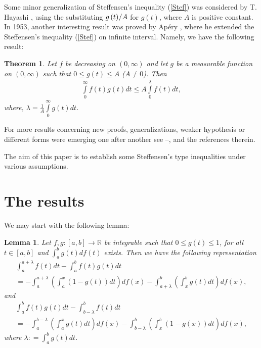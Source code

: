 \documentclass{amsart}
\newtheorem{theorem}{Theorem}
\theoremstyle{plain}
\newtheorem{lemma}{Lemma}
\numberwithin{equation}{section}
\begin{document}
Some minor generalization of Steffensen's inequality (\ref{Stef})
was considered by T. Hayashi \cite{RefD}, using the substituting $
{{g\left( t \right)} \mathord{\left/
 {\vphantom {{g\left( t \right)} A}} \right.
 \kern-\nulldelimiterspace} A}$ for $g\left( t \right)$, where $A$ is positive constant.
In 1953, another interesting result was proved by Ap\'{e}ry
\cite{RefA}, where he extended the Steffensen's inequality
(\ref{Stef}) on infinite interval. Namely, we have the following
result:
\begin{theorem}
Let $f$ be decreasing on $(0, \infty)$ and let $g$ be a measurable
function on $(0, \infty)$ such that $0 \le g(t) \le A$ ($A\neq
0$). Then
\begin{eqnarray}
\label{Apery} \int\limits_{0}^{\infty} {f\left( t \right)g\left( t
\right)dt} \le A \int\limits_0^{\lambda } {f\left( t \right)dt},
\end{eqnarray}
where, $\lambda  = \frac{1}{A}\int\limits_0^{\infty} {g\left( t
\right)dt}$.
\end{theorem}
For more results concerning new proofs, generalizations, weaker
hypothesis or different forms were emerging one after another see
\cite{RefA}--\cite{RefN}, and the references therein.
\newline



The aim of this paper is to establish some Steffensen's type
inequalities under various assumptions.


\section{The results }

We may start with the following lemma:
\begin{lemma}\cite{RefK}
\label{lemma1}Let $f,g: [a,b] \to \mathbb{R}$ be integrable such
that $0 \le g(t) \le 1$, for all $t \in [a,b]$ and $\int_a^b
{g\left( t \right)df\left( t \right)}$  exists. Then we have the
following representation
\begin{multline}
\label{eq2.1}\int_a^{a + \lambda } {f\left( t \right)dt}  -
\int_a^b {f\left( t \right)g\left( t \right)dt}
\\
= -  \int_a^{a + \lambda } {\left( {\int_a^x {\left( {1 - g\left(
t \right)} \right)dt} } \right)df\left( x \right)} - \int_{a +
\lambda }^b {\left( {\int_x^b {g\left( t \right)dt} }
\right)df\left( x \right)} ,
\end{multline}
and
\begin{multline}
\label{eq2.2} \int_a^b {f\left( t \right)g\left( t \right)dt -
\int_{b - \lambda }^b {f\left( t \right)dt} }
\\
=  - \int_a^{b - \lambda } {\left( {\int_a^x {g(t)dt} }
\right)df\left( x \right)}  - \int_{b - \lambda }^b {\left(
{\int_x^b {\left( {1 - g\left( x \right)} \right)dt} }
\right)df\left( x \right)},
\end{multline}
where $\lambda : = \int_a^b {g\left( t \right)dt}$.
\end{lemma}
\end{document}
